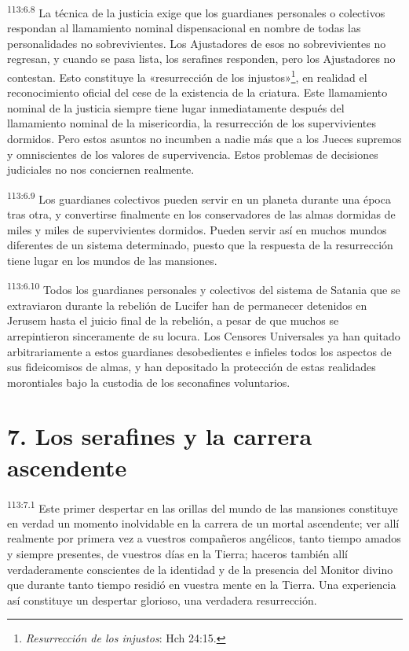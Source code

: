 \par
\textsuperscript{113:6.8} La técnica de la justicia exige que los guardianes personales o colectivos respondan al llamamiento nominal dispensacional en nombre de todas las personalidades no sobrevivientes. Los Ajustadores de esos no sobrevivientes no regresan, y cuando se pasa lista, los serafines responden, pero los Ajustadores no contestan. Esto constituye la «resurrección de los injustos»\footnote{\textit{Resurrección de los injustos}: Hch 24:15.}, en realidad el reconocimiento oficial del cese de la existencia de la criatura. Este llamamiento nominal de la justicia siempre tiene lugar inmediatamente después del llamamiento nominal de la misericordia, la resurrección de los supervivientes dormidos. Pero estos asuntos no incumben a nadie más que a los Jueces supremos y omniscientes de los valores de supervivencia. Estos problemas de decisiones judiciales no nos conciernen realmente.

\par
\textsuperscript{113:6.9} Los guardianes colectivos pueden servir en un planeta durante una época tras otra, y convertirse finalmente en los conservadores de las almas dormidas de miles y miles de supervivientes dormidos. Pueden servir así en muchos mundos diferentes de un sistema determinado, puesto que la respuesta de la resurrección tiene lugar en los mundos de las mansiones.

\par
\textsuperscript{113:6.10} Todos los guardianes personales y colectivos del sistema de Satania que se extraviaron durante la rebelión de Lucifer han de permanecer detenidos en Jerusem hasta el juicio final de la rebelión, a pesar de que muchos se arrepintieron sinceramente de su locura. Los Censores Universales ya han quitado arbitrariamente a estos guardianes desobedientes e infieles todos los aspectos de sus fideicomisos de almas, y han depositado la protección de estas realidades morontiales bajo la custodia de los seconafines voluntarios.

\section*{7. Los serafines y la carrera ascendente}
\par
\textsuperscript{113:7.1} Este primer despertar en las orillas del mundo de las mansiones constituye en verdad un momento inolvidable en la carrera de un mortal ascendente; ver allí realmente por primera vez a vuestros compañeros angélicos, tanto tiempo amados y siempre presentes, de vuestros días en la Tierra; haceros también allí verdaderamente conscientes de la identidad y de la presencia del Monitor divino que durante tanto tiempo residió en vuestra mente en la Tierra. Una experiencia así constituye un despertar glorioso, una verdadera resurrección.

